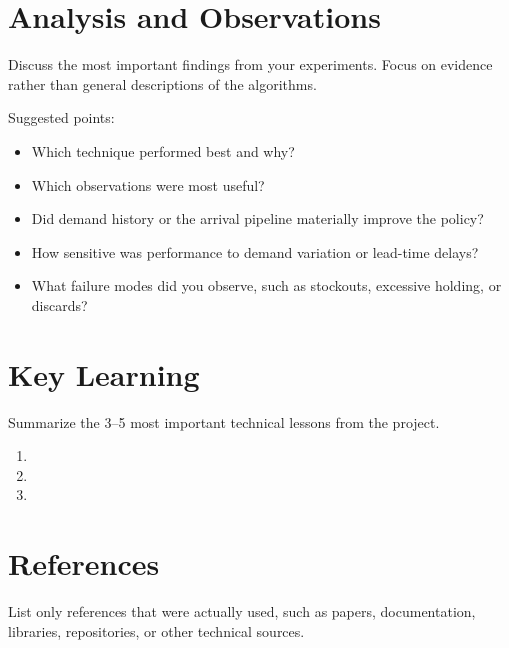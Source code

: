 \documentclass[11pt,a4paper]{article}
\begin{document}
\section{Analysis and Observations}

Discuss the most important findings from your experiments. Focus on evidence rather than general descriptions of the algorithms.

Suggested points:
\begin{itemize}
    \item Which technique performed best and why?
    \item Which observations were most useful?
    \item Did demand history or the arrival pipeline materially improve the policy?
    \item How sensitive was performance to demand variation or lead-time delays?
    \item What failure modes did you observe, such as stockouts, excessive holding, or discards?
\end{itemize}

\section{Key Learning}

Summarize the 3--5 most important technical lessons from the project.

\begin{enumerate}
    \item 
    \item 
    \item 
\end{enumerate}

\section*{References}

List only references that were actually used, such as papers, documentation, libraries, repositories, or other technical sources.
\end{document}
